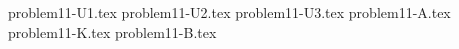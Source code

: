 \documentclass{article}
\begin{document}
{problem11-U1.tex}
{problem11-U2.tex}
{problem11-U3.tex}
{problem11-A.tex}
{problem11-K.tex}
{problem11-B.tex}
\end{document}
